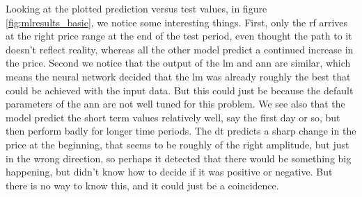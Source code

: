 Looking at the plotted prediction versus test values, in figure \ref{fig:mlresults_basic}, we notice some interesting things. First, only the \acrshort{rf} arrives at the right price range at the end of the test period, even thought the path to it doesn't reflect reality, whereas all the other model predict a continued increase in the price. Second we notice that the output of the \acrshort{lm} and \acrshort{ann} are similar, which means the neural network decided that the \acrlong{lm} was already roughly the best that could be achieved with the input data. But this could just be because the default parameters of the \acrshort{ann} are not well tuned for this problem. We see also that the model predict the short term values relatively well, say the first day or so, but then perform badly for longer time periods.
The \acrshort{dt} predicts a sharp change in the price at the beginning, that seems to be roughly of the right amplitude, but just in the wrong direction, so perhaps it detected that there would be something big happening, but didn't know how to decide if it was positive or negative. But there is no way to know this, and it could just be a coincidence.
